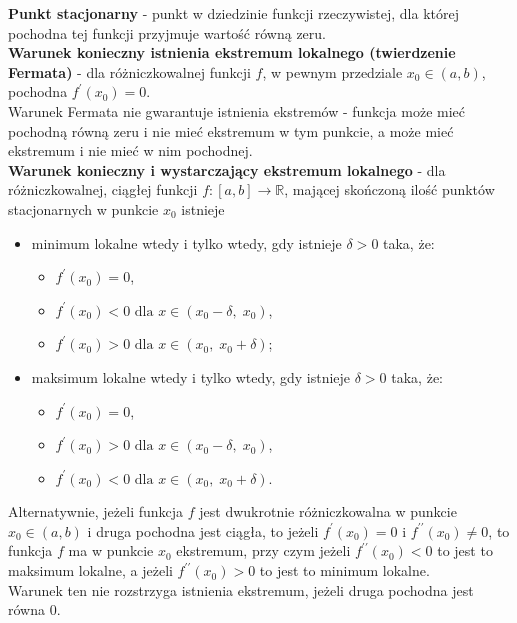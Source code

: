 \documentclass[14pt,a4paper]{extarticle}
\begin{document}
\noindent\textbf{Punkt stacjonarny} - punkt w dziedzinie funkcji rzeczywistej, dla której pochodna tej
funkcji przyjmuje wartość równą zeru.\\

\noindent\textbf{Warunek konieczny istnienia ekstremum lokalnego (twierdzenie Fermata)} - dla różniczkowalnej funkcji $f$,
w pewnym przedziale $x_{0} \in (a, b)$, pochodna $f^{\prime}(x_{0}) = 0$.\\
Warunek Fermata nie gwarantuje istnienia ekstremów - funkcja może mieć pochodną równą zeru i nie mieć ekstremum
w tym punkcie, a może mieć ekstremum i nie mieć w nim pochodnej.\\

\noindent\textbf{Warunek konieczny i wystarczający ekstremum lokalnego} - dla różniczkowalnej, ciągłej funkcji $f: [a, b] \rightarrow \mathbb{R}$,
mającej skończoną ilość punktów stacjonarnych w punkcie $x_{0}$ istnieje
\begin{itemize}
   \item minimum lokalne wtedy i tylko wtedy, gdy istnieje $\delta > 0$ taka, że:
      \begin{itemize}
         \item $f^{\prime}(x_{0}) = 0$,
         \item $f^{\prime}(x_{0}) < 0 \text{ dla } x \in (x_{0} - \delta,\; x_{0})$,
         \item $f^{\prime}(x_{0}) > 0 \text{ dla } x \in (x_{0},\; x_{0} + \delta)$;
      \end{itemize}
   \hfill\break
   \item maksimum lokalne wtedy i tylko wtedy, gdy istnieje $\delta > 0$ taka, że:
      \begin{itemize}
         \item $f^{\prime}(x_{0}) = 0$,
         \item $f^{\prime}(x_{0}) > 0 \text{ dla } x \in (x_{0} - \delta,\; x_{0})$,
         \item $f^{\prime}(x_{0}) < 0 \text{ dla } x \in (x_{0},\; x_{0} + \delta)$.
      \end{itemize}
\end{itemize}

\noindent Alternatywnie, jeżeli funkcja $f$ jest dwukrotnie różniczkowalna w punkcie $x_{0} \in (a, b)$ i druga
pochodna jest ciągła, to jeżeli $f^{\prime}(x_{0}) = 0$ i $f^{\prime\prime}(x_{0}) \neq 0$, to funkcja
$f$ ma w punkcie $x_{0}$ ekstremum, przy czym jeżeli $f^{\prime\prime}(x_{0}) < 0$ to jest to maksimum
lokalne, a jeżeli $f^{\prime\prime}(x_{0}) > 0$ to jest to minimum lokalne.\\
Warunek ten nie rozstrzyga istnienia ekstremum, jeżeli druga pochodna jest równa 0.
\end{document}
